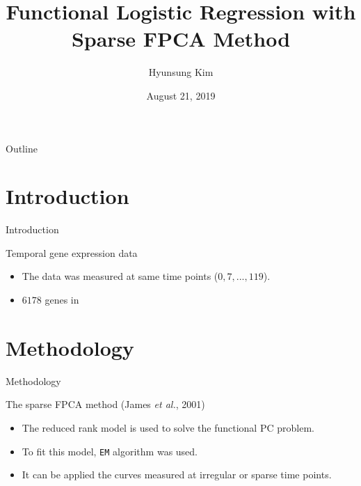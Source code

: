 \documentclass{beamer}
\title{Functional Logistic Regression with Sparse FPCA Method}
\date[Short Occasion]{August 21, 2019}
\author{Hyunsung Kim}
\institute{Department of Statistics\\ Chung-Ang University}
\subtitle{}
\begin{document}
\begin{frame}
  \titlepage
\end{frame}

\begin{frame}{Outline}
  \tableofcontents
\end{frame}

\section{Introduction}
\begin{frame}{Introduction}
	\begin{block}{Temporal gene expression data}
		\vspace{0.1cm}
		\begin{itemize}
			\item {
				The data was measured at same time points ($0, 7, ..., 119$).
			}
			\item {
				$6178$ genes in
			}
		\end{itemize}
	\end{block}
\end{frame}


\section{Methodology}
\begin{frame}{Methodology}
	\begin{block}{The sparse FPCA method (James \textit{et al.}, 2001)}
		\vspace{0.1cm}
		\begin{itemize}
			\item {
				The reduced rank model is used to solve the functional PC problem.
			}
			\item {
				To fit this model, \texttt{EM} algorithm was used.
			}
			\item {
				It can be applied the curves measured at irregular or sparse time points.
			}
		\end{itemize}
	\end{block}
\end{frame}
\end{document}
